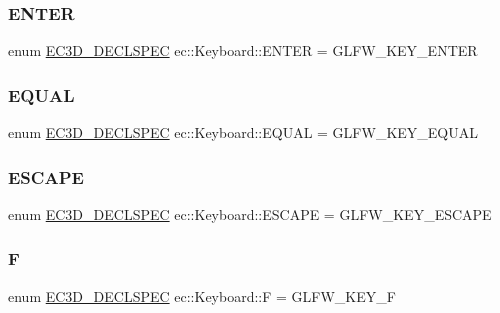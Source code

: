 \subsubsection{\texorpdfstring{E\+N\+T\+ER}{ENTER}}
{\footnotesize\ttfamily enum \mbox{\hyperlink{_common_8h_aac42573e202ca3dd4d259c81691e2369}{E\+C3\+D\+\_\+\+D\+E\+C\+L\+S\+P\+EC}} ec\+::\+Keyboard\+::\+E\+N\+T\+ER = G\+L\+F\+W\+\_\+\+K\+E\+Y\+\_\+\+E\+N\+T\+ER}

\mbox{\label{classec_1_1_keyboard_a051c2a49d048576c1b26eee68956d2f9}} 
\subsubsection{\texorpdfstring{E\+Q\+U\+AL}{EQUAL}}
{\footnotesize\ttfamily enum \mbox{\hyperlink{_common_8h_aac42573e202ca3dd4d259c81691e2369}{E\+C3\+D\+\_\+\+D\+E\+C\+L\+S\+P\+EC}} ec\+::\+Keyboard\+::\+E\+Q\+U\+AL = G\+L\+F\+W\+\_\+\+K\+E\+Y\+\_\+\+E\+Q\+U\+AL}

\mbox{\label{classec_1_1_keyboard_a1685dbfbb1c03114c8121162e333f9b0}} 
\subsubsection{\texorpdfstring{E\+S\+C\+A\+PE}{ESCAPE}}
{\footnotesize\ttfamily enum \mbox{\hyperlink{_common_8h_aac42573e202ca3dd4d259c81691e2369}{E\+C3\+D\+\_\+\+D\+E\+C\+L\+S\+P\+EC}} ec\+::\+Keyboard\+::\+E\+S\+C\+A\+PE = G\+L\+F\+W\+\_\+\+K\+E\+Y\+\_\+\+E\+S\+C\+A\+PE}

\mbox{\label{classec_1_1_keyboard_a60c5617a98a4b1ff360ccd1c4fd48251}} 
\subsubsection{\texorpdfstring{F}{F}}
{\footnotesize\ttfamily enum \mbox{\hyperlink{_common_8h_aac42573e202ca3dd4d259c81691e2369}{E\+C3\+D\+\_\+\+D\+E\+C\+L\+S\+P\+EC}} ec\+::\+Keyboard\+::F = G\+L\+F\+W\+\_\+\+K\+E\+Y\+\_\+F}

